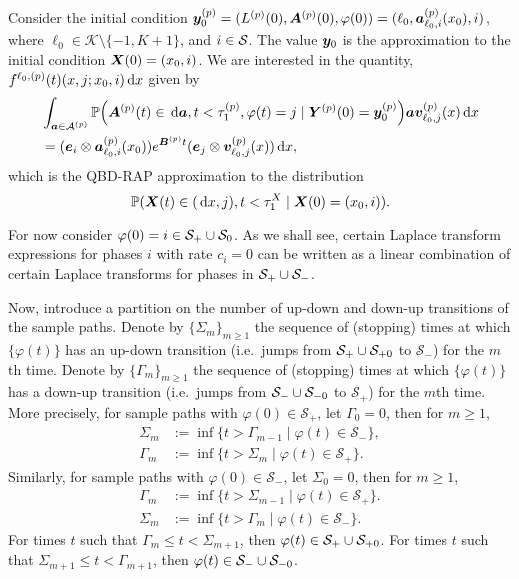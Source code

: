 Consider the initial condition \(\boldsymbol y_0^{(p)} = (L^{(p)}(0),\boldsymbol A^{(p)}(0),\varphi(0))=(\ell_0,\boldsymbol a^{(p)}_{\ell_0,i}(x_0),i)\), where \(\ell_0\in\mathcal K\setminus \{-1,K+1\}\), and \(i\in\mathcal{S}\). The value \(\boldsymbol y_0\) is the approximation to the initial condition \(\boldsymbol X(0)=(x_0,i)\). We are interested in the quantity, \(f^{\ell_0,(p)}(t)(x,j;x_0,i)\, \mathrm{d} x\) given by
\begin{align}
	&\int_{\boldsymbol a \in \mathcal A^{(p)}}\mathbb P\Big(\boldsymbol A^{(p)}(t)\in \, \mathrm{d} \boldsymbol a, t<\tau_1^{(p)}, \varphi(t) = j \nonumber
	\mid \boldsymbol Y^{(p)}(0) = \boldsymbol y_0^{(p)}\Big)
	\boldsymbol a{\boldsymbol v}_{\ell_0,j}^{(p)}(x)\, \mathrm{d} x \nonumber 
	\\&= (\boldsymbol e_i\otimes \boldsymbol  a_{\ell_0,i}^{(p)}(x_0)) e^{\boldsymbol{B}^{(p)}t}(\boldsymbol e_j \otimes {\boldsymbol v}_{\ell_0,j}^{(p)}( x))\, \mathrm{d} x, \label{eqn: ldll}
\end{align}
which is the QBD-RAP approximation to the distribution 
\[\mathbb P(\boldsymbol X(t)\in (\, \mathrm{d} x,j), t<\tau_1^X \mid \boldsymbol X(0) = (x_0, i)).\]

For now consider \(\varphi(0)=i\in\mathcal{S}_+\cup\mathcal{S}_0\). As we shall see, certain Laplace transform expressions for phases \(i\) with rate \(c_i=0\) can be written as a linear combination of certain Laplace transforms for phases in \(\mathcal{S}_+\cup\mathcal{S}_-\). 

Now, introduce a partition on the number of up-down and down-up transitions of the sample paths. Denote by \(\{\Sigma_m\}_{m\geq 1}\) the sequence of (stopping) times at which \(\{\varphi(t)\}\) has an up-down transition (i.e.~jumps from \(\mathcal S_+\cup\mathcal{S}_{+0}\) to \(\mathcal S_- \)) for the \(m\)th time. Denote by \(\{\Gamma_m\}_{m\geq 1}\) the sequence of (stopping) times at which \(\{\varphi(t)\}\) has a down-up transition (i.e.~jumps from \(\mathcal S_-\cup\mathcal{S}_{-0}\) to \(\mathcal S_+\)) for the \(m\)th time. More precisely, for sample paths with \(\varphi(0)\in\mathcal S_+\), let \(\Gamma_0=0\), then for \(m\geq 1\), 
\begin{align}
	\Sigma_m &:=\inf\{t > \Gamma_{m-1} \mid \varphi(t)\in\mathcal S_-\}, 
	\\ \Gamma_m &:=\inf\{t > \Sigma_{m} \mid \varphi(t)\in\mathcal S_+\}.
\end{align}
Similarly, for sample paths with \(\varphi(0)\in\mathcal S_-\), let \(\Sigma_0=0\), then for \(m\geq 1\), 
\begin{align}
	\Gamma_m &:=\inf\{t > \Sigma_{m-1} \mid \varphi(t)\in\mathcal S_+\}.
	\\\Sigma_m &:=\inf\{t > \Gamma_{m} \mid \varphi(t)\in\mathcal S_-\}.
\end{align}
For times \(t\) such that \(\Gamma_m\leq t<\Sigma_{m+1}\), then \(\varphi(t)\in\mathcal S_+\cup\mathcal{S}_{+0}\). For times \(t\) such that \(\Sigma_{m+1}\leq t< \Gamma_{m+1}\), then \(\varphi(t)\in\mathcal S_-\cup\mathcal{S}_{-0}\).


